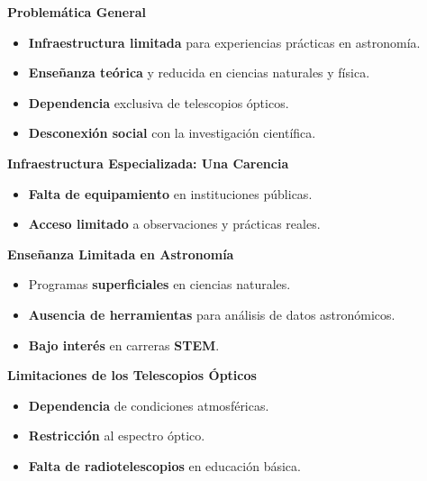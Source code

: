 \begin{frame}{\textbf{Problemática General}}
  \begin{block}{}
    \begin{itemize}
      \item \textbf{Infraestructura limitada} para experiencias prácticas en astronomía.
        \pause
      \item \textbf{Enseñanza teórica} y reducida en ciencias naturales y física.
        \pause
      \item \textbf{Dependencia} exclusiva de telescopios ópticos.
        \pause
      \item \textbf{Desconexión social} con la investigación científica.
    \end{itemize}
  \end{block}
\end{frame}

\begin{frame}{\textbf{Infraestructura Especializada: Una Carencia}}
  \begin{alertblock}{}
    \begin{itemize}
      \item \textbf{Falta de equipamiento} en instituciones públicas.
        \pause
      \item \textbf{Acceso limitado} a observaciones y prácticas reales.
    \end{itemize}
  \end{alertblock}
\end{frame}

\begin{frame}{\textbf{Enseñanza Limitada en Astronomía}}
  \begin{block}{}
    \begin{itemize}
      \item Programas \textbf{superficiales} en ciencias naturales.
        \pause
      \item \textbf{Ausencia de herramientas} para análisis de datos astronómicos.
        \pause
      \item \textbf{Bajo interés} en carreras \textbf{STEM}.
    \end{itemize}
  \end{block}
\end{frame}

\begin{frame}{\textbf{Limitaciones de los Telescopios Ópticos}}
  \begin{alertblock}{}
    \begin{itemize}
      \item \textbf{Dependencia} de condiciones atmosféricas.
        \pause
      \item \textbf{Restricción} al espectro óptico.
        \pause
      \item \textbf{Falta de radiotelescopios} en educación básica.
    \end{itemize}
  \end{alertblock}
\end{frame}

